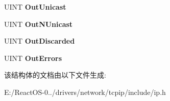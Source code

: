 \begin{DoxyCompactItemize}
U\+I\+NT {\bfseries Out\+Unicast}
\item 
\mbox{\label{struct___s_e_n_d___r_e_c_v___s_t_a_t_s_a3ba1e94b6607f3a2e31a5e81a762d092}} 
U\+I\+NT {\bfseries Out\+N\+Unicast}
\item 
\mbox{\label{struct___s_e_n_d___r_e_c_v___s_t_a_t_s_ada839852dd2a231fbd84914f8e7c62b1}} 
U\+I\+NT {\bfseries Out\+Discarded}
\item 
\mbox{\label{struct___s_e_n_d___r_e_c_v___s_t_a_t_s_a39167c8d381eefccdedc8c0534656f97}} 
U\+I\+NT {\bfseries Out\+Errors}
\end{DoxyCompactItemize}


该结构体的文档由以下文件生成\+:\begin{DoxyCompactItemize}
\item 
E\+:/\+React\+O\+S-\/0../drivers/network/tcpip/include/ip.\+h\end{DoxyCompactItemize}
